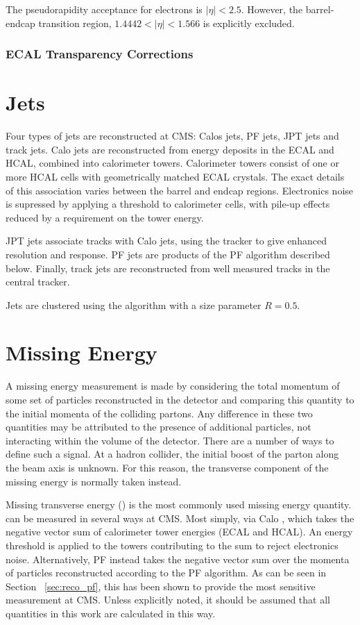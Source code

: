 The pseudorapidity acceptance for electrons is $|\eta| < 2.5$. However, the
barrel-endcap transition region, $1.4442 < |\eta| < 1.566$ is explicitly excluded.



\subsubsection{\ac{ECAL} Transparency Corrections}
\label{sec:reco_ecal_transparency}
\section{Jets}
Four types of jets are reconstructed at \ac{CMS}: \acp{Calo} jets, \ac{PF} jets,
\ac{JPT} jets and track jets. \ac{Calo} jets are reconstructed from energy
deposits in the \ac{ECAL} and \ac{HCAL}, combined into calorimeter
towers. Calorimeter towers consist of one or more \ac{HCAL} cells with
geometrically matched \ac{ECAL} crystals. The exact details of this association
varies between the barrel and endcap regions. Electronics noise is supressed by
applying a threshold to calorimeter cells, with pile-up effects reduced by a
requirement on the tower energy.

\ac{JPT} jets associate tracks with \ac{Calo} jets, using the tracker to give
enhanced \Pt resolution and response. \ac{PF} jets are products of the \acl{PF}
algorithm described below. Finally, track jets are reconstructed from well
measured tracks in the central tracker.

Jets are clustered using the \antiKT algorithm \cite{antiKT} with a size
parameter $R=0.5$.

\section{Missing Energy}
A missing energy measurement is made by considering the total momentum of some
set of particles reconstructed in the detector and comparing this quantity to
the initial momenta of the colliding partons. Any difference in these two
quantities may be attributed to the presence of additional particles, not
interacting within the volume of the detector. There are a number of ways to
define such a signal. At a hadron collider, the initial boost of the parton
along the beam axis is unknown. For this reason, the transverse component of the
missing energy is normally taken instead.

Missing transverse energy (\MET) is the most commonly used missing energy
quantity. \MET can be measured in several ways at \ac{CMS}. Most simply, via
\ac{Calo} \MET, which takes the negative vector sum of calorimeter tower
energies (\ac{ECAL} and \ac{HCAL}). An energy threshold is applied to the towers
contributing to the sum to reject electronics noise. Alternatively, \ac{PF} \MET
instead takes the negative vector sum over the momenta of particles
reconstructed according to the \acl{PF} algorithm. As can be seen in Section~
\ref{sec:reco_pf}, this has been shown to provide the most sensitive \MET
measurement at \ac{CMS}. Unless explicitly noted, it should be assumed that all
\MET quantities in this work are calculated in this way.

